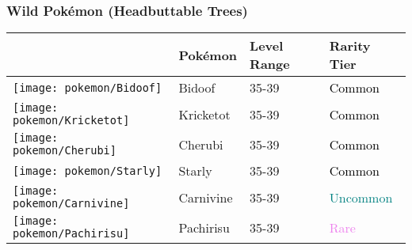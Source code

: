 \subsubsection{Wild Pokémon (Headbuttable Trees)}%
\label{ssubsec:WildPokmon(HeadbuttableTrees)}%
\begin{longtable}{||l l l l||}%
\hline%
&Pokémon&Level Range&Rarity Tier\\%
\hline%
\endhead%
\hline%
\texttt{[image: pokemon/Bidoof]}&Bidoof&35{-}39&\textcolor{black}{%
Common%
}\\%
\hline%
\texttt{[image: pokemon/Kricketot]}&Kricketot&35{-}39&\textcolor{black}{%
Common%
}\\%
\hline%
\texttt{[image: pokemon/Cherubi]}&Cherubi&35{-}39&\textcolor{black}{%
Common%
}\\%
\hline%
\texttt{[image: pokemon/Starly]}&Starly&35{-}39&\textcolor{black}{%
Common%
}\\%
\hline%
\texttt{[image: pokemon/Carnivine]}&Carnivine&35{-}39&\textcolor{teal}{%
Uncommon%
}\\%
\hline%
\texttt{[image: pokemon/Pachirisu]}&Pachirisu&35{-}39&\textcolor{violet}{%
Rare%
}\\%
\hline%
\end{longtable}%
\caption{Wild Pokemon in Lake Valor (Headbuttable Trees)}
